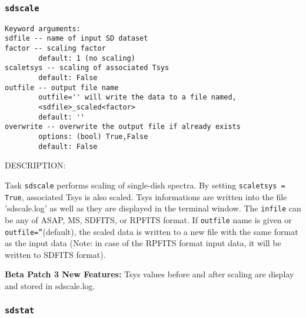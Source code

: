 \subsubsection{{\tt sdscale}}
\label{section:sd.sdtasks.tasks.sdscale}

\begin{verbatim}
Keyword arguments:
sdfile -- name of input SD dataset
factor -- scaling factor
        default: 1 (no scaling)
scaletsys -- scaling of associated Tsys
        default: False
outfile -- output file name
        outfile='' will write the data to a file named,
        <sdfile>_scaled<factor>
        default: ''
overwrite -- overwrite the output file if already exists
        options: (bool) True,False
        default: False
\end{verbatim}

    DESCRIPTION:

    Task {\tt sdscale} performs scaling of single-dish spectra.
    By setting {\tt scaletsys = True}, associated Tsys is also scaled.
    Tsys informations are written into the file 'sdscale.log'
    as well as they are displayed in the terminal window.
    The {\tt infile} can be any of ASAP, MS, SDFITS, or RPFITS format.
    If {\tt outfile} name is given or {\tt outfile=''}(default), the scaled data is written
    to a new file with the same format as the input data (Note: in case of the
    RPFITS format input data, it will be written to SDFITS format).

    {\bf Beta Patch 3 New Features:}
    Tsys values before and after scaling are display and stored
    in sdscale.log.

\subsubsection{{\tt sdstat}}
\label{section:sd.sdtasks.tasks.sdstat}

